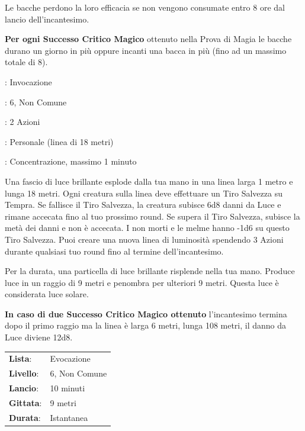 \begin{multicols}{2}
Le bacche perdono la loro efficacia se non vengono consumate entro 8 ore dal lancio dell'incantesimo.

\textbf{Per ogni Successo Critico Magico} ottenuto nella Prova di Magia le bacche durano un giorno in più oppure incanti una bacca in più (fino ad un massimo totale di 8).

\noindent
\begin{description}[noitemsep, topsep=0pt, parsep=0pt, partopsep=0pt, leftmargin=0cm, labelwidth=1.3cm]
	\item[\textbf{Lista}]: Invocazione
	\item[\textbf{Livello}]: 6, Non Comune
	\item[\textbf{Lancio}]: 2 Azioni
	\item[\textbf{Gittata}]: Personale (linea di 18 metri)
	\item[\textbf{Durata}]: Concentrazione, massimo 1 minuto
\end{description}

Una fascio di luce brillante esplode dalla tua mano in una linea larga 1 metro e lunga 18 metri. Ogni creatura sulla linea deve effettuare un Tiro Salvezza su Tempra. Se fallisce il Tiro Salvezza, la creatura subisce 6d8 danni da Luce e rimane accecata fino al tuo prossimo round. Se supera il Tiro Salvezza, subisce la metà dei danni e non è accecata. I non morti e le melme hanno -1d6 su questo Tiro Salvezza. Puoi creare una nuova linea di luminosità spendendo 3 Azioni durante qualsiasi tuo round fino al termine dell'incantesimo.

Per la durata, una particella di luce brillante risplende nella tua mano. Produce luce in un raggio di 9 metri e penombra per ulteriori 9 metri. Questa luce è considerata luce solare.

\textbf{In caso di due Successo Critico Magico ottenuto} l'incantesimo termina dopo il primo raggio ma la linea è larga 6 metri, lunga 108 metri, il danno da Luce diviene 12d8.

\noindent\begin{tabularx}{\linewidth}{p{1.3cm}X}
	\rowcolor{gray!20}\textbf{Lista}: & Evocazione \\
	\textbf{Livello}: & 6, Non Comune \\
	\rowcolor{gray!20}\textbf{Lancio}: & 10 minuti \\
	\textbf{Gittata}: & 9 metri \\
	\rowcolor{gray!20}\textbf{Durata}: & Istantanea \\
\end{tabularx}\smallskip


\end{multicols}
